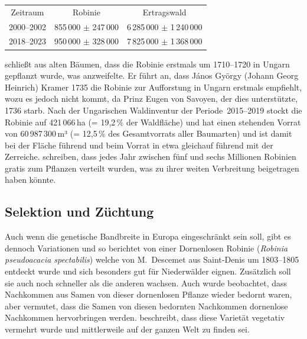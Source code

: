 \documentclass[twocolumn]{scrartcl}
\begin{document}
\begin{table}[htbp]
  \centering
\begin{tabular}{ccc}
Zeitraum   & Robinie  & Ertragswald \\
2000--2002  & 855\,000 $\pm$ 247\,000 & 6\,285\,000 $\pm$ 1\,240\,000 \\
2018--2023  & 950\,000 $\pm$ 328\,000 & 7\,825\,000 $\pm$ 1\,368\,000 
  \end{tabular}
  \label{tab:waldinventur}
\end{table}

\citet[S.~3]{vadas1911robinie} schließt aus alten Bäumen, dass
die Robinie erstmals um 1710--1720 in Ungarn gepflanzt wurde, was
\citet[S.~179]{ernyey1926robinie} anzweifelte. Er führt an, dass
János György (Johann Georg Heinrich) Kramer 1735 die Robinie zur
Aufforstung in Ungarn erstmals empfiehlt, wozu es jedoch nicht kommt, da
Prinz Eugen von Savoyen, der dies unterstützte, 1736 starb. Nach der
Ungarischen Waldinventur \citep{waldinventur20152019ungarn} der
Periode~2015--2019 stockt die Robinie auf
421\,066\,ha (= 19,2\,\% der Waldfläche) und hat einen stehenden Vorrat von
60\,987\,300\,m³ (= 12,5\,\% des Gesamtvorrats aller Baumarten) und ist
damit bei der Fläche führend und beim Vorrat in etwa gleichauf führend
mit der Zerreiche. \cite{bund1899robinie,gaskil1906robinie} schreiben,
dass jedes Jahr
zwischen fünf und sechs Millionen Robinien gratis zum Pflanzen verteilt wurden,
was zu ihrer weiten Verbreitung beigetragen haben könnte.

\subsection{Selektion und Züchtung}

Auch wenn die genetische Bandbreite in Europa eingeschränkt sein soll,
gibt es dennoch Variationen und so berichtet
\citet[S.~259--260]{Michaux1813arbres} von einer Dornenlosen Robinie
(\emph{Robinia pseudoacacia spectabilis}) welche von M.~Descemet aus
Saint‑Denis um 1803--1805 entdeckt wurde und sich besonders gut für
Niederwälder eignen. Zusätzlich soll sie auch noch schneller als die
anderen wachsen. Auch wurde beobachtet, dass Nachkommen aus Samen von
dieser dornenlosen Pflanze wieder bedornt waren, aber
\citet{Michaux1813arbres} vermutet, dass die Samen von diesen
bedornten Nachkommen dornenlose Nachkommen hervorbringen
werden. \citet[S.~173]{quatrefages1861robinie} beschreibt, dass diese
Varietät vegetativ vermehrt wurde und mittlerweile auf der ganzen Welt
zu finden sei.
\end{document}

